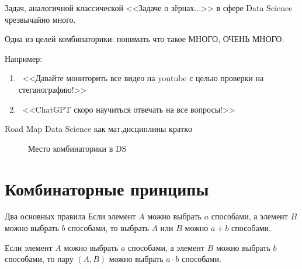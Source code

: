 \begin{frame}
Задач, аналогичной классической 
<<Задаче о зёрнах...>>
в сфере Data Science чрезвычайно много.

Одна из целей комбинаторики:
понимать что такое МНОГО, ОЧЕНЬ МНОГО.

Например:
\begin{enumerate}
	\item ~<<Давайте мониторить все видео на youtube с целью проверки на стеганографию!>>
	\item ~<<ChatGPT скоро научиться отвечать на все вопросы!>>
\end{enumerate}
 	
\end{frame}


\begin{frame}
	Road Map Data Science как мат.дисциплины \(кратко\)
	\begin{center}
		\begin{figure}
			
			\caption{Место комбинаторики в DS}
		\end{figure}	
	\end{center}
	
\end{frame}

\section{Комбинаторные принципы}\label{section:principles}

\begin{frame}{Два основных правила}
Если элемент $A$ можно выбрать $a$ способами,
а элемент $B$ можно выбрать $b$ способами,
то выбрать $A$ или $B$ 
можно $a+b$ способами.

Если элемент $A$ можно выбрать $a$ способами,
а элемент $B$ можно выбрать $b$ способами,
то пару $(A, B)$ 
можно выбрать $a \cdot b$ способами.

\end{frame}

